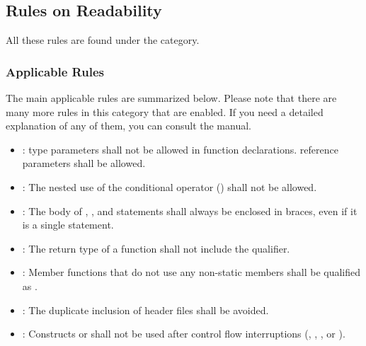 \subsection{Rules on Readability}

All these rules are found under the  category.

\subsubsection{Applicable Rules}

The main applicable rules are summarized below. Please note that there are many more
rules in this category that are enabled. If you need a detailed explanation of any of them,
you can consult the  manual.

\begin{itemize}

\item {}:
 type parameters shall not be allowed in function declarations.
 reference parameters shall be allowed.

\item {}:
The nested use of the conditional operator () shall not be allowed.

\item {}:
The body of , , and  statements shall
always be enclosed in braces, even if it is a single statement.

\item {}:
The return type of a function shall not include the  qualifier.

\item {}:
Member functions that do not use any non-static members shall be qualified as
.

\item {}:
The duplicate inclusion of header files shall be avoided.

\item {}:
Constructs  or  shall not be used after control flow interruptions
(, , , or ).


\end{itemize}
